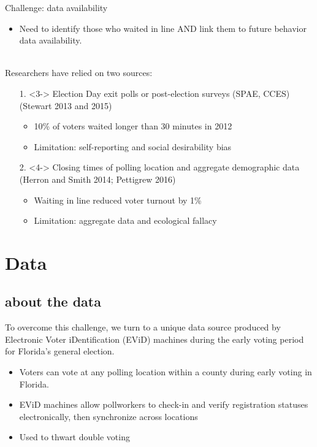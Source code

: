 \documentclass{beamer}
\begin{document}
	\begin{frame}
		Challenge: data availability 
			\begin{itemize}
				\item<2-> Need to identify those who waited in line AND link them to future behavior data availability.\\~\\
			\end{itemize}
		Researchers have relied on two sources:
			\begin{itemize}
				\item[1.]<3-> Election Day exit polls or post-election surveys (SPAE, CCES) {\tiny (Stewart 2013 and 2015)}
					\begin{itemize}
						\item<3-> {\small 10\% of voters waited longer than 30 minutes in 2012}
						\item<3-> {\small Limitation: self-reporting and social desirability bias}
					\end{itemize}
				\item[2.]<4-> Closing times of polling location and aggregate demographic data {\tiny (Herron and Smith 2014; Pettigrew 2016)}
					\begin{itemize}
						\item<4-> {\small Waiting in line reduced voter turnout by 1\%}
						\item<4-> {\small Limitation: aggregate data and ecological fallacy}
					\end{itemize}
			\end{itemize}
	\end{frame}
		
	
	\section{Data}
	\subsection{about the data}
		\begin{frame}
		 To overcome this challenge, we turn to a unique data source produced by Electronic Voter iDentification (EViD) machines during the early voting period for Florida's general election. 
		 	\begin{itemize}
				\item<2->  Voters can vote at any polling location within a county during early voting in Florida.
				\item<2-> EViD machines allow pollworkers to check-in and verify registration statuses electronically, then synchronize across locations
				\item<2-> Used to thwart double voting 
			\end{itemize}
		\end{frame}
		
\end{document}
